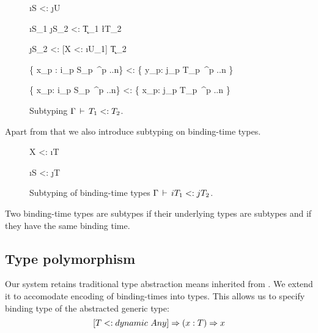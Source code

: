 \begin{figure}[H]


  {\Gamma \ts \i{S} <: \j{U}}

  {\Gamma \ts \i{S_1} \ra \j{S_2} <: \k{T_1} \ra \l{T_2}}

  {\Gamma \ts [X <: \i{U_1}] \ra \j{S_2} <: [X <: \i{U_1}] \ra \k{T_2}}

  {\{ x_p : i_p S_p\ ^{p ..n}\} <: \{ y_p: j_p T_p\ ^{p ..n} \} }

  {\{ x_p: i_p S_p\ ^{p ..n}\} <: \{ x_p: j_p T_p\ ^{p ..n} \}}

\caption{Subtyping $\Gamma \,\vdash\, T_1 <: T_2$.}
\end{figure}

Apart from that we also introduce subtyping on binding-time types.

\begin{figure}[H]
  {\Gamma \ts X <: \i{T}}

  {\Gamma \ts \i{S} <: \j{T}}
\caption{Subtyping of binding-time types $\Gamma \,\vdash\, i T_1 <: j T_2$.}
\end{figure}

Two binding-time types are subtypes if their underlying types are
subtypes and if they have the same binding time.

\subsection{Type polymorphism}

Our system retains traditional type abstraction means inherited from \fsub.
We extend it to accomodate encoding of binding-times into types. This allows
us to specify binding type of the abstracted generic type:
\begin{equation}\nonumber
  [T <: dynamic\ Any] \Rightarrow (x: T) \Rightarrow x
\end{equation}

